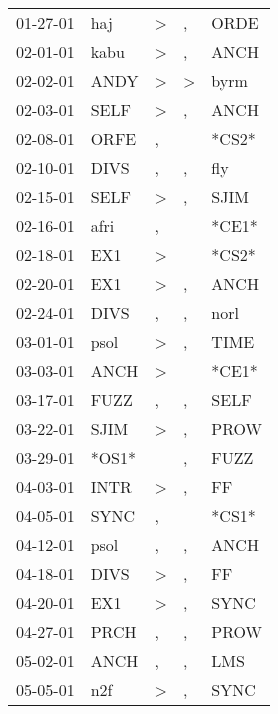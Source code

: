 \begin{supertabular}{lllll}
 01-27-01 &    haj &  \textgreater &                , &   ORDE \\
 02-01-01 &   kabu &  \textgreater &                , &   ANCH \\
 02-02-01 &   ANDY &  \textgreater &     \textgreater &   byrm \\
 02-03-01 &   SELF &  \textgreater &                , &   ANCH \\
 02-08-01 &   ORFE &             , &                  &  *CS2* \\
 02-10-01 &   DIVS &             , &                , &    fly \\
 02-15-01 &   SELF &  \textgreater &                , &   SJIM \\
 02-16-01 &   afri &             , &                  &  *CE1* \\
 02-18-01 &    EX1 &  \textgreater &                  &  *CS2* \\
 02-20-01 &    EX1 &  \textgreater &                , &   ANCH \\
 02-24-01 &   DIVS &             , &                , &   norl \\
 03-01-01 &   psol &  \textgreater &                , &   TIME \\
 03-03-01 &   ANCH &  \textgreater &                  &  *CE1* \\
 03-17-01 &   FUZZ &             , &                , &   SELF \\
 03-22-01 &   SJIM &  \textgreater &                , &   PROW \\
 03-29-01 &  *OS1* &               &                , &   FUZZ \\
 04-03-01 &   INTR &  \textgreater &                , &     FF \\
 04-05-01 &   SYNC &             , &                  &  *CS1* \\
 04-12-01 &   psol &             , &                , &   ANCH \\
 04-18-01 &   DIVS &  \textgreater &                , &     FF \\
 04-20-01 &    EX1 &  \textgreater &                , &   SYNC \\
 04-27-01 &   PRCH &             , &                , &   PROW \\
 05-02-01 &   ANCH &             , &                , &    LMS \\
 05-05-01 &    n2f &  \textgreater &                , &   SYNC \\

\end{supertabular}
